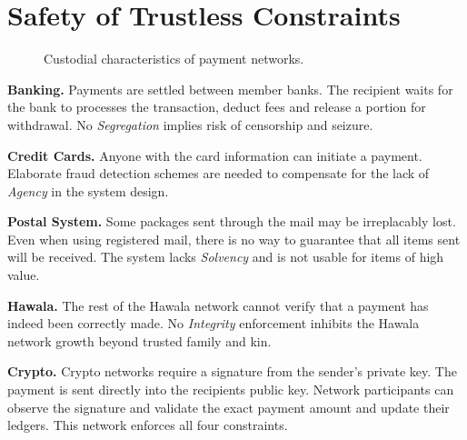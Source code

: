 \documentclass[12pt,a4paper]{article}
\begin{document}
\appendix
\newpage
\section{Safety of Trustless Constraints}\label{app:safety}
\begin{figure}[h]
\centering

\caption{Custodial characteristics of payment networks.}
\label{fig:custody}
\end{figure}

\textbf{Banking.} Payments are settled between member banks. The recipient waits for the bank to processes the transaction, deduct fees and release a portion for withdrawal. No \emph{Segregation} implies risk of censorship and seizure.

\textbf{Credit Cards.} Anyone with the card information can initiate a payment. Elaborate fraud detection schemes are needed to compensate for the lack of \emph{Agency} in the system design.

\textbf{Postal System.} Some packages sent through the mail may be irreplacably lost. Even when using registered mail, there is no way to guarantee that all items sent will be received. The system lacks \emph{Solvency} and is not usable for items of high value.

\textbf{Hawala.} The rest of the Hawala network cannot verify that a payment has indeed been correctly made. No \emph{Integrity} enforcement inhibits the Hawala network growth beyond trusted family and kin. 

\textbf{Crypto.} Crypto networks require a signature from the sender's private key. The payment is sent directly into the recipients public key. Network participants can observe the signature and validate the exact payment amount and update their ledgers. This network enforces all four constraints.
\end{document}
